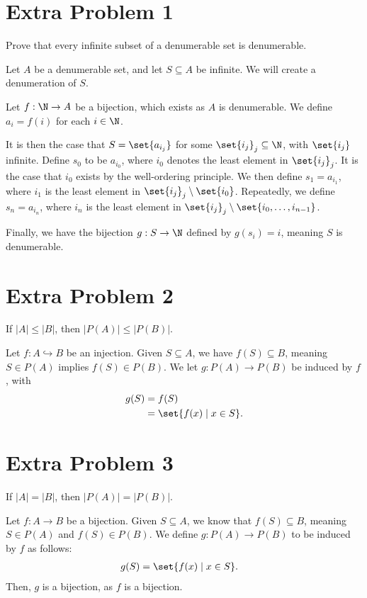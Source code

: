 \documentclass[10pt]{mypackage}
\begin{document}
\section{Extra Problem 1}%
\begin{problem}
  Prove that every infinite subset of a denumerable set is denumerable.
\end{problem}
\begin{solution}
  Let $A$ be a denumerable set, and let $S\subseteq A$ be infinite. We will create a denumeration of $S$.\newline

  Let $f: \N\rightarrow A$ be a bijection, which exists as $A$ is denumerable. We define $a_i = f(i)$ for each $i\in \N$.\newline

  It is then the case that $S = \set{a_{i_j}}$ for some $\set{i_j}_{j}\subseteq \N$, with $\set{i_j}$ infinite. Define $s_0$ to be $a_{i_0}$, where $i_0$ denotes the least element in $\set{i_j}_{j}$. It is the case that $i_0$ exists by the well-ordering principle. We then define $s_1 = a_{i_1}$, where $i_1$ is the least element in $\set{i_j}_{j}\setminus \set{i_0}$. Repeatedly, we define $s_n = a_{i_n}$, where $i_n$ is the least element in $\set{i_j}_{j}\setminus \set{i_0,\dots,i_{n-1}}$.\newline

  Finally, we have the bijection $g: S\rightarrow \N$ defined by $g\left(s_i\right) = i$, meaning $S$ is denumerable.
\end{solution}
\section{Extra Problem 2}%
\begin{problem}
  If $|A| \leq |B|$, then $|P(A)| \leq |P(B)|$.
\end{problem}
\begin{solution}
  Let $f: A\hookrightarrow B$ be an injection. Given $S\subseteq A$, we have $f(S) \subseteq B$, meaning $S\in P(A)$ implies $f(S)\in P(B)$. We let $g: P(A)\rightarrow P(B)$ be induced by $f$, with 
  \begin{align*}
    g(S) &= f(S)\\
         &= \set{f(x)\mid x\in S}.
  \end{align*}
\end{solution}
\section{Extra Problem 3}%
\begin{problem}
  If $|A| = |B|$, then $|P(A)| = |P(B)|$.
\end{problem}
\begin{solution}
  Let $f: A\rightarrow B$ be a bijection. Given $S\subseteq A$, we know that $f(S)\subseteq B$, meaning $S\in P\left(A\right)$ and $f(S)\in P\left(B\right)$. We define $g: P(A) \rightarrow P(B)$ to be induced by $f$ as follows:
  \begin{align*}
    g(S) &= \set{f(x)\mid x\in S}.
  \end{align*}
  Then, $g$ is a bijection, as $f$ is a bijection.
\end{solution}
\end{document}

